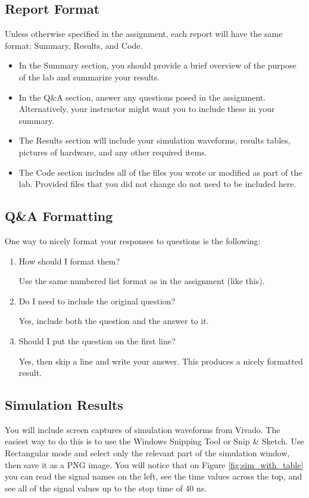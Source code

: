 \documentclass[11pt]{article}
\begin{document}
\subsection*{Report Format}
Unless otherwise specified in the assignment, each report will have the same format: Summary, Results, and Code. 
\begin{itemize}
	\item In the Summary section, you should provide a brief overview of the purpose of the lab and summarize your results. 
	\item In the Q\&A section, answer any questions posed in the assignment.  Alternatively, your instructor might want you to include these in your summary.
	\item The Results section will include your simulation waveforms, results tables, pictures of hardware, and any other required items.  
	\item The Code section includes all of the files you wrote or modified as part of the lab.  Provided files that you did not change do not need to be included here.
\end{itemize}

\subsection*{Q\&A Formatting}
One way to nicely format your responses to questions is the following:

\begin{enumerate}
	\item How should I format them?
	
	Use the same numbered list format as in the assignment (like this).
	
	\item Do I need to include the original question?
	
	Yes, include both the question and the answer to it.
	
	\item Should I put the question on the first line?
	
	Yes, then skip a line and write your answer.  This produces a nicely formatted result.
\end{enumerate}


\subsection*{Simulation Results}
You will include screen captures of simulation waveforms from Vivado.  The easiest way to do this is to use the Windows Snipping Tool or Snip \& Sketch.  Use Rectangular mode and select only the relevant part of the simulation window, then save it as a PNG image.  You will notice that on Figure \ref{fig:sim_with_table} you can read the signal names on the left, see the time values across the top, and see all of the signal values up to the stop time of 40 ns. 
\end{document}
